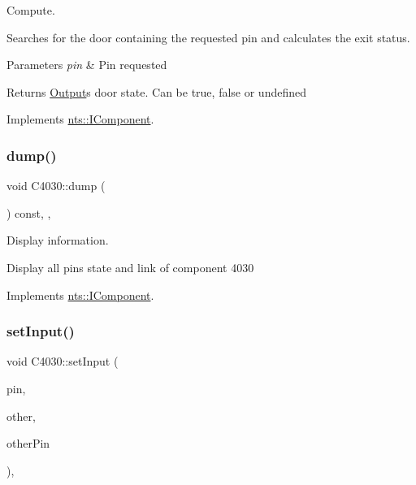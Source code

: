 Compute. 

Searches for the door containing the requested pin and calculates the exit status.


\begin{DoxyParams}{Parameters}
{\em pin} & Pin requested \\
\hline
\end{DoxyParams}
\begin{DoxyReturn}{Returns}
\mbox{\hyperlink{classOutput}{Output}}\textquotesingle{}s door state. Can be true, false or undefined 
\end{DoxyReturn}


Implements \mbox{\hyperlink{classnts_1_1IComponent}{nts\+::\+I\+Component}}.

\mbox{\label{classC4030_a55726374b18c0def739d5f25b19fe6c2}} 
\subsubsection{\texorpdfstring{dump()}{dump()}}
{\footnotesize\ttfamily void C4030\+::dump (\begin{DoxyParamCaption}{ }\end{DoxyParamCaption}) const\hspace{0.3cm}{\ttfamily [override]}, {\ttfamily [virtual]}, {\ttfamily [noexcept]}}



Display information. 

Display all pins state and link of component 4030 

Implements \mbox{\hyperlink{classnts_1_1IComponent}{nts\+::\+I\+Component}}.

\mbox{\label{classC4030_aa857c9828b1642c371976aaa01db4b74}} 
\subsubsection{\texorpdfstring{set\+Input()}{setInput()}}
{\footnotesize\ttfamily void C4030\+::set\+Input (\begin{DoxyParamCaption}\item[{std\+::size\+\_\+t}]{pin,  }\item[{\mbox{\hyperlink{classnts_1_1IComponent}{nts\+::\+I\+Component}} \&}]{other,  }\item[{std\+::size\+\_\+t}]{other\+Pin }\end{DoxyParamCaption})\hspace{0.3cm}{\ttfamily [final]}, {\ttfamily [virtual]}}



